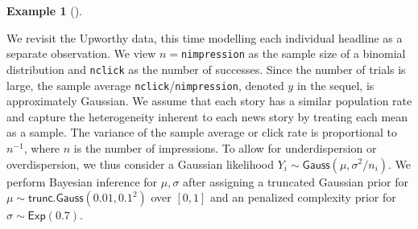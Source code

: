 \documentclass[
  11pt,
  letterpaper,
]{scrbook}
\theoremstyle{definition}
\theoremstyle{definition}
\newtheorem{example}{Example}[chapter]
\theoremstyle{definition}
\theoremstyle{plain}
\theoremstyle{plain}
\theoremstyle{remark}
\begin{document}
\begin{example}[]\protect\hypertarget{exm-normal-question-upworthy}{}\label{exm-normal-question-upworthy}

We revisit the Upworthy data, this time modelling each individual
headline as a separate observation. We view \(n=\)\texttt{nimpression}
as the sample size of a binomial distribution and \texttt{nclick} as the
number of successes. Since the number of trials is large, the sample
average \texttt{nclick}/\texttt{nimpression}, denoted \(y\) in the
sequel, is approximately Gaussian. We assume that each story has a
similar population rate and capture the heterogeneity inherent to each
news story by treating each mean as a sample. The variance of the sample
average or click rate is proportional to \(n^{-1}\), where \(n\) is the
number of impressions. To allow for underdispersion or overdispersion,
we thus consider a Gaussian likelihood
\(Y_i \sim \mathsf{Gauss}(\mu, \sigma^2/n_i)\). We perform Bayesian
inference for \(\mu, \sigma\) after assigning a truncated Gaussian prior
for \(\mu \sim \mathsf{trunc. Gauss}(0.01, 0.1^2)\) over \([0,1]\) and
an penalized complexity prior for \(\sigma \sim \mathsf{Exp}(0.7)\).


\end{example}
\end{document}
